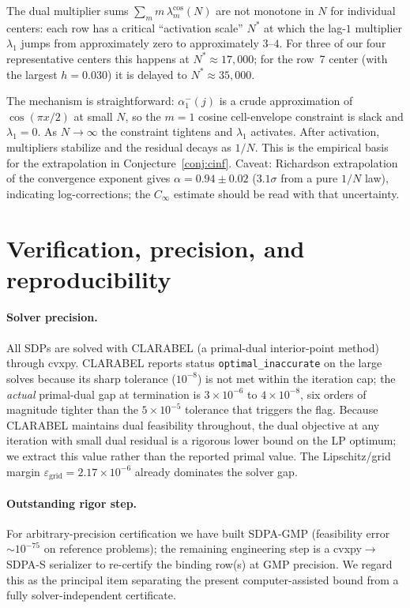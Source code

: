 \documentclass[11pt]{article}
\theoremstyle{plain}
\theoremstyle{definition}
\begin{document}
The dual multiplier sums $\sum_m m\, \lambda_m^{\cos}(N)$ are not
monotone in $N$ for individual centers: each row has a critical
``activation scale'' $N^*$ at which the lag-$1$ multiplier $\lambda_1$
jumps from approximately zero to approximately $3$--$4$. For three of
our four representative centers this happens at $N^* \approx 17{,}000$;
for the row~7 center (with the largest $h = 0.030$) it is delayed to
$N^* \approx 35{,}000$.

The mechanism is straightforward: $\alpha_1^-(j)$ is a crude
approximation of $\cos(\pi x / 2)$ at small $N$, so the $m=1$ cosine
cell-envelope constraint is slack and $\lambda_1 = 0$. As $N \to \infty$
the constraint tightens and $\lambda_1$ activates. After activation,
multipliers stabilize and the residual decays as $1/N$. This is the
empirical basis for the extrapolation in Conjecture~\ref{conj:cinf}.
Caveat: Richardson extrapolation of the convergence exponent gives
$\alpha = 0.94 \pm 0.02$ ($3.1\sigma$ from a pure $1/N$ law),
indicating log-corrections; the $C_\infty$ estimate should be read with
that uncertainty.

\section{Verification, precision, and reproducibility}\label{sec:precision}

\paragraph{Solver precision.} All SDPs are solved with CLARABEL (a
primal-dual interior-point method) through cvxpy. CLARABEL reports
status \texttt{optimal\_inaccurate} on the large solves because its
sharp tolerance ($10^{-8}$) is not met within the iteration cap; the
\emph{actual} primal-dual gap at termination is $3 \times 10^{-6}$ to
$4 \times 10^{-8}$, six orders of magnitude tighter than the
$5\times 10^{-5}$ tolerance that triggers the flag. Because CLARABEL
maintains dual feasibility throughout, the dual objective at any
iteration with small dual residual is a rigorous lower bound on the LP
optimum; we extract this value rather than the reported primal value.
The Lipschitz/grid margin $\varepsilon_{\text{grid}} = 2.17\times
10^{-6}$ already dominates the solver gap.

\paragraph{Outstanding rigor step.} For arbitrary-precision
certification we have built SDPA-GMP (feasibility error $\sim 10^{-75}$
on reference problems); the remaining engineering step is a
cvxpy$\to$SDPA-S serializer to re-certify the binding row(s) at GMP
precision. We regard this as the principal item separating the present
computer-assisted bound from a fully solver-independent certificate.
\end{document}
